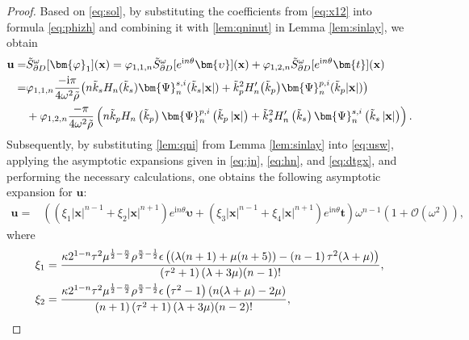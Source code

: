 \documentclass[11pt,reqno,twoside]{amsart}
\theoremstyle{definition}
\theoremstyle{remark}
\numberwithin{equation}{section}
\newcommand{\bu}{\mathbf{u}}
\newcommand{\bx}{\mathbf{x}}
\begin{document}
\begin{proof}
	Based on \eqref{eq:sol}, by substituting the coefficients from \eqref{eq:x12} into formula \eqref{eq:phizh} and combining it with  \eqref{lem:qninut} in Lemma \ref{lem:sinlay}, we obtain
	\begin{align}
		\bu =&\tilde{S}_{\partial D }^{\omega }[\bm{\varphi} _{1} ] (\bx) 
		=\varphi _{1,1,n}\tilde{S}_{\partial D }^{\omega }[e^{\mathrm{i}n\theta }\bm{\upsilon}] (\bx)+\varphi _{1,2,n}\tilde{S}_{\partial D }^{\omega }[e^{\mathrm{i}n\theta }\bm{t}] (\bx) \label{eq:usw}\\
		=&\varphi _{1,1,n}\frac{-\mathrm{i}\pi}{4\omega^{2}\tilde{\rho} }\big(n\tilde{k}_{s}H_{n}(\tilde{k}_{s})\bm{\Psi}_{n}^{s,i}(\tilde{k}_{s}|\bx|)+\tilde{k}_{p}^{2}H_{n}^{\prime}\big(\tilde{k}_{p}\big)\bm{\Psi}_{n}^{p,i}(\tilde{k}_{p}|\mathbf{x}|)\big)\notag\\
		&+\varphi _{1,2,n}\frac{-\pi }{4\omega ^{2} \tilde{\rho}} \left ( n\tilde{k}_{p}H_{n}\left (\tilde{k}_{p} \right ) \bm{\Psi}_{n}^{p,i} \left (\tilde{k}_{p} \left | \bx \right |  \right ) +\tilde{k}_{s}^{2}  H_{n}'\left ( \tilde{k}_{s}  \right )  \bm{\Psi}_{n}^{s,i} \left (\tilde{k}_{s} \left | \bx \right |  \right ) \right ).\notag
	\end{align}
	Subsequently, by substituting  \eqref{lem:qni} from Lemma \ref{lem:sinlay} into \eqref{eq:usw}, applying the asymptotic expansions given in \eqref{eq:jn}, \eqref{eq:hn}, and \eqref{eq:dtgx}, and performing the necessary calculations, one obtains the following asymptotic expansion for $\bu$:
	\begin{align}\label{eq:uae}
		\bu
		=&\left(\left(\xi _1|\bx|^{n-1}+\xi_2|\bx|^{n+1}\right)e^{\mathrm{i}n\theta }\bm{\upsilon}+\left(\xi _3|\bx|^{n-1}+\xi_4|\bx|^{n+1}\right)e^{\mathrm{i}n\theta }\bm{t}\right)\omega ^{n-1}\left(1+\mathcal{O}\left(\omega^2\right)\right),
	\end{align}
	where
	\begin{align}
		\xi _1&=\frac{\kappa 2^{1-n} \tau ^2 \mu ^{\frac{1}{2}-\frac{n}{2}} \rho ^{\frac{n}{2}-\frac{1}{2}} \epsilon\left( (\lambda  (n+1)+\mu  (n+5))-\left(n-1\right) \tau ^2 (\lambda +\mu )\right)}{ \left(\tau ^2+1\right) (\lambda +3 \mu ) (n-1)!},\notag\\
		\xi _2&=\frac{\kappa 2^{1-n} \tau ^2 \mu ^{\frac{1}{2}-\frac{n}{2}} \rho ^{\frac{n}{2}-\frac{1}{2}} \epsilon  \left(\tau ^2-1\right)  (n (\lambda +\mu )-2 \mu )}{(n+1) \left(\tau ^2+1\right) (\lambda +3 \mu ) (n-2)!},\notag\\

\end{align}
\end{proof}
\end{document}

